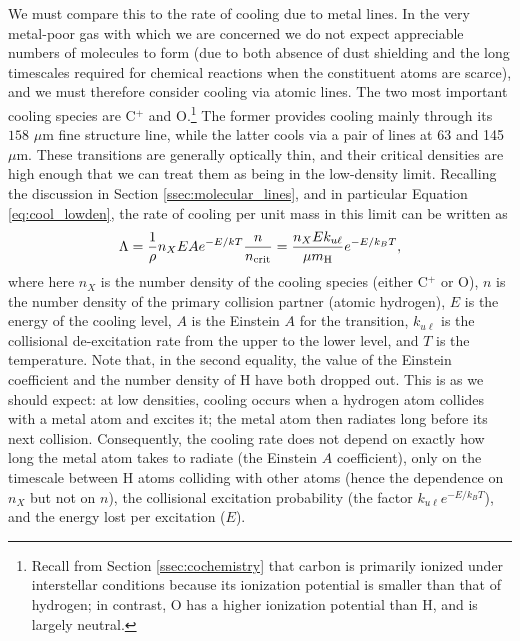 We must compare this to the rate of cooling due to metal lines. In the very metal-poor gas with which we are concerned we do not expect appreciable numbers of molecules to form (due to both absence of dust shielding and the long timescales required for chemical reactions when the constituent atoms are scarce), and we must therefore consider cooling via atomic lines. The two most important cooling species are C$^+$ and O.\footnote{Recall from Section \ref{ssec:cochemistry} that carbon is primarily ionized under interstellar conditions because its ionization potential is smaller than that of hydrogen; in contrast, O has a higher ionization potential than H, and is largely neutral.} The former provides cooling mainly through its $158$ $\mu$m fine structure line, while the latter cools via a pair of lines at 63 and 145 $\mu$m. These transitions are generally optically thin, and their critical densities are high enough that we can treat them as being in the low-density limit. Recalling the discussion in Section \ref{ssec:molecular_lines}, and in particular Equation \ref{eq:cool_lowden}, the rate of cooling per unit mass in this limit can be written as
\begin{equation}
\Lambda = \frac{1}{\rho}n_X E A e^{-E/kT} \frac{n}{n_{\rm crit}} = \frac{n_X E k_{u\ell}}{\mu m_{\rm H}} e^{-E/k_B T},
\end{equation}
where here $n_X$ is the number density of the cooling species (either C$^+$ or O), $n$ is the number density of the primary collision partner (atomic hydrogen), $E$ is the energy of the cooling level, $A$ is the Einstein $A$ for the transition, $k_{u\ell}$ is the collisional de-excitation rate from the upper to the lower level, and $T$ is the temperature. Note that, in the second equality, the value of the Einstein coefficient and the number density of H have both dropped out. This is as we should expect: at low densities, cooling occurs when a hydrogen atom collides with a metal atom and excites it; the metal atom then radiates long before its next collision. Consequently, the cooling rate does not depend on exactly how long the metal atom takes to radiate (the Einstein $A$ coefficient), only on the timescale between H atoms colliding with other atoms (hence the dependence on $n_X$ but not on $n$), the collisional excitation probability (the factor $k_{u\ell} e^{-E/k_B T}$), and the energy lost per excitation ($E$).

